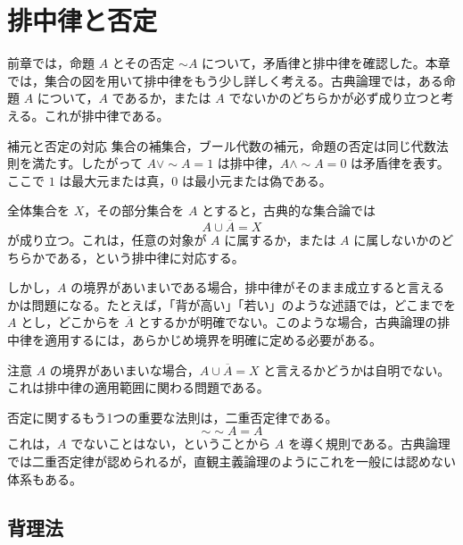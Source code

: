 \documentclass[../main.tex]{subfiles}
\begin{document}
\section{排中律と否定}

前章では，命題 \(A\) とその否定 \(\sim A\) について，矛盾律と排中律を確認した。本章では，集合の図を用いて排中律をもう少し詳しく考える。古典論理では，ある命題 \(A\) について，\(A\) であるか，または \(A\) でないかのどちらかが必ず成り立つと考える。これが排中律である。

\begin{sidebox}[TBred]{補元と否定の対応}
  集合の補集合，ブール代数の補元，命題の否定は同じ代数法則を満たす。したがって \(A\lor\sim A=1\) は排中律，\(A\land\sim A=0\) は矛盾律を表す。ここで \(1\) は最大元または真，\(0\) は最小元または偽である。
\end{sidebox}

\begin{center}
\end{center}

全体集合を \(X\)，その部分集合を \(A\) とすると，古典的な集合論では
\[
  A \cup \overline{A} = X
\]
が成り立つ。これは，任意の対象が \(A\) に属するか，または \(A\) に属しないかのどちらかである，という排中律に対応する。

しかし，\(A\) の境界があいまいである場合，排中律がそのまま成立すると言えるかは問題になる。たとえば，「背が高い」「若い」のような述語では，どこまでを \(A\) とし，どこからを \(\overline{A}\) とするかが明確でない。このような場合，古典論理の排中律を適用するには，あらかじめ境界を明確に定める必要がある。

\begin{sidebox}[TBred]{注意}
  \(A\) の境界があいまいな場合，\(A \cup \overline{A}=X\) と言えるかどうかは自明でない。これは排中律の適用範囲に関わる問題である。
\end{sidebox}

否定に関するもう1つの重要な法則は，二重否定律である。
\[
  \sim\sim A = A
\]
これは，\(A\) でないことはない，ということから \(A\) を導く規則である。古典論理では二重否定律が認められるが，直観主義論理のようにこれを一般には認めない体系もある。

\subsection{背理法}
\end{document}
